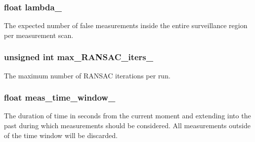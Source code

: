\subsubsection[{\texorpdfstring{lambda\+\_\+}{lambda_}}]{\setlength{\rightskip}{0pt plus 5cm}float lambda\+\_\+}\hypertarget{classrransac_1_1Parameters_a9641ef02cbdcbde767036579f6023476}{}\label{classrransac_1_1Parameters_a9641ef02cbdcbde767036579f6023476}
The expected number of false measurements inside the entire surveillance region per measurement scan. 
\subsubsection[{\texorpdfstring{max\+\_\+\+R\+A\+N\+S\+A\+C\+\_\+iters\+\_\+}{max_RANSAC_iters_}}]{\setlength{\rightskip}{0pt plus 5cm}unsigned int max\+\_\+\+R\+A\+N\+S\+A\+C\+\_\+iters\+\_\+}\hypertarget{classrransac_1_1Parameters_a6974d80270ce8aff078dee4b6c591431}{}\label{classrransac_1_1Parameters_a6974d80270ce8aff078dee4b6c591431}
The maximum number of R\+A\+N\+S\+AC iterations per run. 
\subsubsection[{\texorpdfstring{meas\+\_\+time\+\_\+window\+\_\+}{meas_time_window_}}]{\setlength{\rightskip}{0pt plus 5cm}float meas\+\_\+time\+\_\+window\+\_\+}\hypertarget{classrransac_1_1Parameters_a8987bc5bc3e7bbd7ed6233cc0cf6c58f}{}\label{classrransac_1_1Parameters_a8987bc5bc3e7bbd7ed6233cc0cf6c58f}
The duration of time in seconds from the current moment and extending into the past during which measurements should be considered. All measurements outside of the time window will be discarded. 
